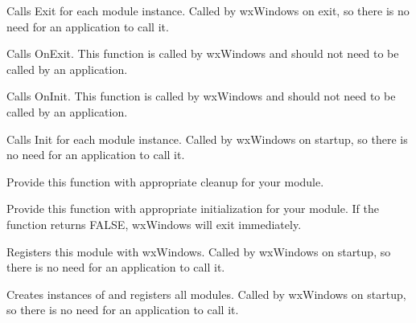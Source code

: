 
Calls Exit for each module instance. Called by wxWindows on exit, so there is no
need for an application to call it.

\label{wxmoduleexit}


Calls OnExit. This function is called by wxWindows and should not need to be called
by an application.

\label{wxmoduleinit}


Calls OnInit. This function is called by wxWindows and should not need to be called
by an application.

\label{wxmoduleinitializemodules}


Calls Init for each module instance. Called by wxWindows on startup, so there is no
need for an application to call it.

\label{wxmoduleonexit}


Provide this function with appropriate cleanup for your module.

\label{wxmoduleoninit}


Provide this function with appropriate initialization for your module. If the function
returns FALSE, wxWindows will exit immediately.

\label{wxmoduleregistermodule}


Registers this module with wxWindows. Called by wxWindows on startup, so there is no
need for an application to call it.

\label{wxmoduleregistermodules}


Creates instances of and registers all modules. Called by wxWindows on startup, so there is no
need for an application to call it.

